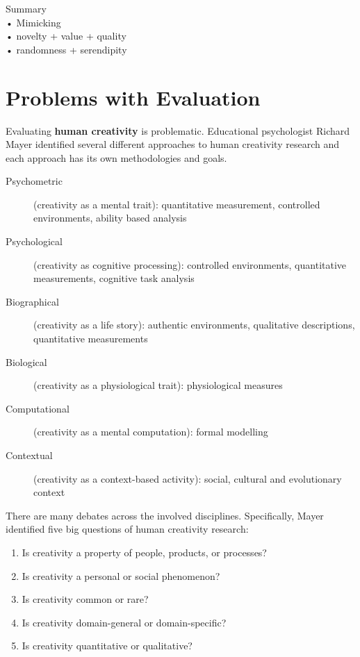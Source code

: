 \begin{shaded}
  Summary\\
  •	Mimicking\\
  •	novelty + value + quality\\
  •	randomness + serendipity
\end{shaded}

\section{Problems with Evaluation}

Evaluating \textbf{human creativity} is problematic. Educational psychologist Richard Mayer identified several different approaches to human creativity research and each approach has its own methodologies and goals. \citep[p.453]{Mayer1999}

\begin{description}
  \item [Psychometric] (creativity as a mental trait): quantitative measurement, controlled environments, ability based analysis
  \item [Psychological] (creativity as cognitive processing): controlled environments, quantitative measurements, cognitive task analysis
  \item [Biographical] (creativity as a life story): authentic environments, qualitative descriptions, quantitative measurements
  \item [Biological] (creativity as a physiological trait): physiological measures
  \item [Computational] (creativity as a mental computation): formal modelling
  \item [Contextual] (creativity as a context-based activity): social, cultural and evolutionary context
\end{description}

There are many debates across the involved disciplines. Specifically, Mayer identified five big questions of human creativity research: \citep[p.450-451]{Mayer1999}

\begin{enumerate}
  \item Is creativity a property of people, products, or processes?
  \item Is creativity a personal or social phenomenon?
  \item Is creativity common or rare?
  \item Is creativity domain-general or domain-specific?
  \item Is creativity quantitative or qualitative?
\end{enumerate}

